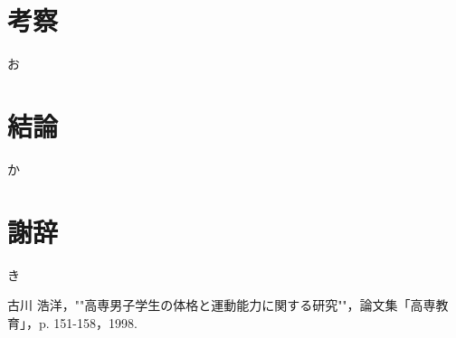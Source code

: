 \documentclass[11pt,dvipdfmx]{jarticle}
\begin{document}
\section{考察}
お

\section{結論}
か

\section{謝辞}
き


\begin{thebibliography}{99}
 古川 浩洋，""高専男子学生の体格と運動能力に関する研究""，論文集「高専教育」，p. 151-158，1998.
\end{thebibliography}
\end{document}
